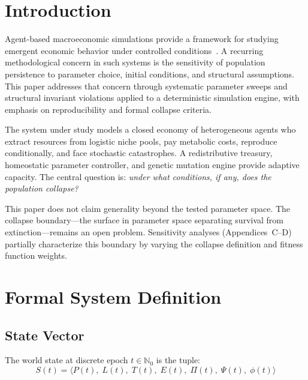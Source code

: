 \documentclass[11pt,a4paper]{article}
\begin{document}
\section{Introduction}

Agent-based macroeconomic simulations provide a framework for studying emergent economic behavior under controlled conditions~\citep{epstein1996growing,tesfatsion2006handbook}. A recurring methodological concern in such systems is the sensitivity of population persistence to parameter choice, initial conditions, and structural assumptions. This paper addresses that concern through systematic parameter sweeps and structural invariant violations applied to a deterministic simulation engine, with emphasis on reproducibility and formal collapse criteria.

The system under study models a closed economy of heterogeneous agents who extract resources from logistic niche pools, pay metabolic costs, reproduce conditionally, and face stochastic catastrophes. A redistributive treasury, homeostatic parameter controller, and genetic mutation engine provide adaptive capacity. The central question is: \emph{under what conditions, if any, does the population collapse?}

This paper does not claim generality beyond the tested parameter space. The collapse boundary---the surface in parameter space separating survival from extinction---remains an open problem. Sensitivity analyses (Appendices~C--D) partially characterize this boundary by varying the collapse definition and fitness function weights.

\section{Formal System Definition}

\subsection{State Vector}

The world state at discrete epoch $t \in \mathbb{N}_0$ is the tuple:
\begin{equation}
  S(t) = \langle P(t),\; L(t),\; T(t),\; E(t),\; \Pi(t),\; \Psi(t),\; \phi(t) \rangle
\end{equation}
\end{document}
